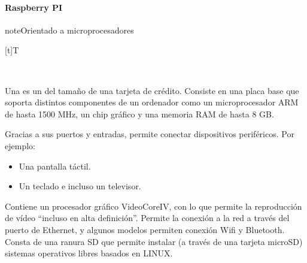 \documentclass[letterpaper,10pt,spanish]{sphinxmanual}
\let\sphinxpxdimen\pdfpxdimen\else\newdimen\sphinxpxdimen
\begin{document}
\paragraph{Raspberry PI}
\label{\detokenize{1_guias/10informatica/G1004:raspberry-pi}}
\begin{sphinxadmonition}{note}{Orientado a microprocesadores}


\begin{savenotes}\sphinxattablestart
\sphinxthistablewithglobalstyle
\centering
\begin{tabulary}{\linewidth}[t]{T}
\sphinxtoprule
\sphinxtableatstartofbodyhook

\begin{sphinxfigure-in-table}
\centering
\capstart
\noindent\sphinxincludegraphics[width=400\sphinxpxdimen]{{image082}.png}
\label{\detokenize{1_guias/10informatica/G1004:id9}}\end{sphinxfigure-in-table}\relax
\\
\sphinxbottomrule
\end{tabulary}
\sphinxtableafterendhook\par
\sphinxattableend\end{savenotes}

\sphinxAtStartPar
Una  es un  del tamaño de una tarjeta de crédito. Consiste en una placa base que soporta distintos componentes de un ordenador como un micro\sphinxhyphen{}procesador ARM de hasta 1500 MHz, un chip gráfico y una memoria RAM de hasta 8 GB.

\sphinxAtStartPar
Gracias a sus puertos y entradas, permite conectar dispositivos periféricos. Por ejemplo:
\begin{itemize}
\item {} 
\sphinxAtStartPar
Una pantalla táctil.

\item {} 
\sphinxAtStartPar
Un teclado e incluso un televisor.

\end{itemize}

\sphinxAtStartPar
Contiene un procesador gráfico VideoCoreIV, con lo que permite la reproducción de vídeo “incluso en alta definición”. Permite la conexión a la red a través del puerto de Ethernet, y algunos modelos permiten conexión Wifi y Bluetooth. Consta de una ranura SD que permite instalar (a través de una tarjeta microSD) sistemas operativos libres basados en LINUX.
\end{sphinxadmonition}
\end{document}
